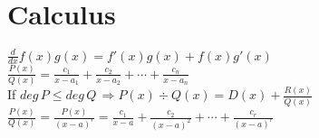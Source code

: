\section{Calculus}
\begin{math}
  \frac{d}{dx} f(x)g(x) = f'(x)g(x) + f(x)g'(x)
\end{math} \\[2pt]
\begin{math}
  \frac{P(x)}{Q(x)} = \frac{c_1}{x - a_1} + \frac{c_2}{x - a_2} + \dotsb + \frac{c_n}{x - a_n}
\end{math} \\[2pt]
If
\begin{math}
  deg \, P \leq deg \, Q \, \Rightarrow P(x) \div Q(x) = D(x) + \frac{R(x)}{Q(x)}
\end{math} \\[2pt]
\begin{math}
  \frac{P(x)}{Q(x)} = \frac{P(x)}{(x - a)^r} = \frac{c_1}{x - a} + \frac{c_2}{(x - a)^2} + \dotsb + \frac{c_r}{(x - a)^r}
\end{math} \\[2pt]
